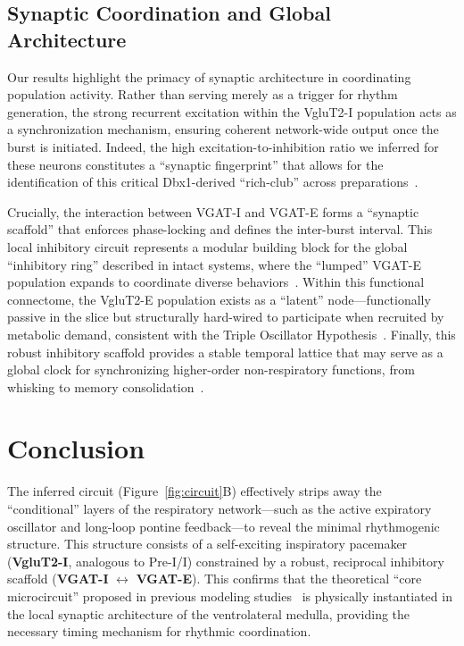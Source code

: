 \documentclass{article}
\begin{document}
\subsection{Synaptic Coordination and Global Architecture}
Our results highlight the primacy of synaptic architecture in coordinating population activity. Rather than serving merely as a trigger for rhythm generation, the strong recurrent excitation within the VgluT2-I population acts as a synchronization mechanism, ensuring coherent network-wide output once the burst is initiated. Indeed, the high excitation-to-inhibition ratio we inferred for these neurons constitutes a ``synaptic fingerprint'' that allows for the identification of this critical Dbx1-derived ``rich-club'' across preparations~\citep{molkov2024inference}.

Crucially, the interaction between VGAT-I and VGAT-E forms a ``synaptic scaffold'' that enforces phase-locking and defines the inter-burst interval. This local inhibitory circuit represents a modular building block for the global ``inhibitory ring'' described in intact systems, where the ``lumped'' VGAT-E population expands to coordinate diverse behaviors~\citep{molkov2024inference}. Within this functional connectome, the VgluT2-E population exists as a ``latent'' node---functionally passive in the slice but structurally hard-wired to participate when recruited by metabolic demand, consistent with the Triple Oscillator Hypothesis~\citep{anderson2017respiratory}. Finally, this robust inhibitory scaffold provides a stable temporal lattice that may serve as a global clock for synchronizing higher-order non-respiratory functions, from whisking to memory consolidation~\citep{molkov2024inference}.
\section{Conclusion}
The inferred circuit (Figure~\ref{fig:circuit}B) effectively strips away the ``conditional'' layers of the respiratory network---such as the active expiratory oscillator and long-loop pontine feedback---to reveal the minimal rhythmogenic structure. This structure consists of a self-exciting inspiratory pacemaker (\textbf{VgluT2-I}, analogous to Pre-I/I) constrained by a robust, reciprocal inhibitory scaffold (\textbf{VGAT-I} $\leftrightarrow$ \textbf{VGAT-E}). This confirms that the theoretical ``core microcircuit'' proposed in previous modeling studies~\citep{molkov2016computational} is physically instantiated in the local synaptic architecture of the ventrolateral medulla, providing the necessary timing mechanism for rhythmic coordination.




\end{document}
